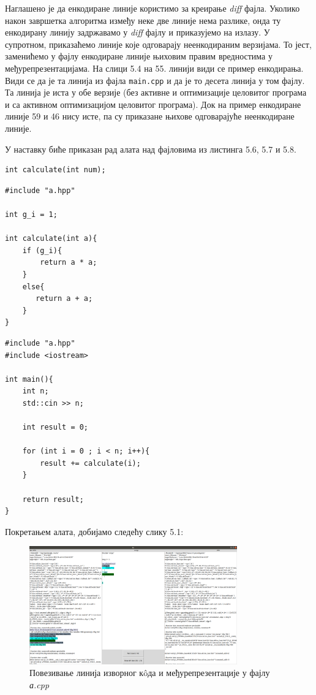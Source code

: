 \documentclass[12pt,oneside]{memoir}
\begin{document}
Наглашено је да енкодиране линије користимо за креирање \textit{diff} фајла.
Уколико након завршетка алгоритма између неке две линије нема разлике, онда ту
енкодирану линију задржавамо у \textit{diff} фајлу и приказујемо на излазу.
У супротном, приказаћемо линије које одговарају неенкодираним верзијама.
То јест, заменићемо у фајлу енкодиране линије њиховим правим вредностима у међурепрезентацијама.
На слици 5.4 на 55. линији види се пример енкодирања. 
Види се да је та линија из фајла \texttt{main.cpp} и да је то десета линија у том фајлу.
Та линија је иста у обе верзије (без активне и оптимизације целовитог програма
и са активном оптимизацијом целовитог програма).
Док на пример енкодиране линије 59 и 46 нису исте, па су приказане њихове
 одговарајуће неенкодиране линије. 

У наставку биће приказан рад алата над фајловима из листинга 5.6, 5.7 и 5.8.

\begin{lstlisting}[frame=single, caption=a.hpp, captionpos=b]
int calculate(int num);
\end{lstlisting}

\begin{lstlisting}[frame=single, caption=a.cpp, captionpos=b]
#include "a.hpp"

int g_i = 1;

int calculate(int a){
    if (g_i){
        return a * a;
    }
    else{
       return a + a;
    }  
}
\end{lstlisting}

\begin{lstlisting}[frame=single, caption=main.cpp, captionpos=b]
#include "a.hpp"
#include <iostream>

int main(){
    int n;
    std::cin >> n;
    
    int result = 0;

    for (int i = 0 ; i < n; i++){
        result += calculate(i);
    }

    return result;
}

\end{lstlisting}

Покретањем алата, добијамо следећу слику 5.1:

\begin{figure}[!ht]
  \centering
  \includegraphics[width=0.8\textwidth]{a_cpp.png}
  \caption{ Повезивање линија изворног к\^{o}да и међурепрезентације у фајлу \textit{а.cpp }  }
  \label{fig:grafikon}
\end{figure}
\end{document}
